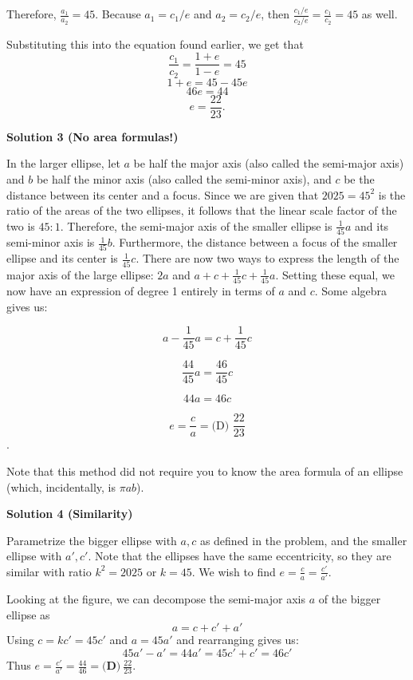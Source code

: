 \begin{enumerate}
 Therefore, $\frac{a_1}{a_2} = 45$. Because $a_1 = c_1/e$ and $a_2 = c_2/e$, then $\frac{c_1/e}{c_2/e} = \frac{c_1}{c_2}=45$ as well.

 Substituting this into the equation found earlier, we get that 
 \[\frac{c_1}{c_2} = \frac{1+e}{1-e} = 45\]
 \[1+e = 45-45e\]
 \[46e = 44\]
 \[e = \boxed{\frac{22}{23}}.\]




\textbf{Solution 3 (No area formulas!)}

In the larger ellipse, let $a$ be half the major axis (also called the semi-major axis) and $b$ be half the minor axis (also called the semi-minor axis), and $c$ be the distance between its center and a focus. Since we are given that $2025 = 45^2$ is the ratio of the areas of the two ellipses, it follows that the linear scale factor of the two is $45:1$. Therefore, the semi-major axis of the smaller ellipse is $\frac{1}{45}a$ and its semi-minor axis is $\frac{1}{45}b$. Furthermore, the distance between a focus of the smaller ellipse and its center is $\frac{1}{45}c$. There are now two ways to express the length of the major axis of the large ellipse: $2a$ and $a + c + \frac{1}{45}c + \frac{1}{45}a$. Setting these equal, we now have an expression of degree 1 entirely in terms of $a$ and $c$. Some algebra gives us:

 

 \[a-\frac{1}{45}a=c+\frac{1}{45}c\]

 \[\frac{44}{45}a=\frac{46}{45}c\]

 \[44a=46c\]

 \[e=\frac{c}{a}=\boxed{\text{(D) }\dfrac{22}{23}}\].

 
Note that this method did not require you to know the area formula of an ellipse (which, incidentally, is $\pi a b$).

 



\textbf{Solution 4 (Similarity)}

Parametrize the bigger ellipse with $a,c$ as defined in the problem, and the smaller ellipse with $a',c'$. Note that the ellipses have the same eccentricity, so they are similar with ratio $k^2=2025$ or $k=45$. We wish to find $e=\frac{c}{a}=\frac{c'}{a'}$.

 Looking at the figure, we can decompose the semi-major axis $a$ of the bigger ellipse as
 \[a=c+c'+a'\]Using $c=kc'=45c'$ and $a=45a'$ and rearranging gives us:
 \[45a'-a'=44a'=45c'+c'=46c'\]Thus $e=\frac{c'}{a'}=\frac{44}{46}=\boxed{\textbf{(D)}~\frac{22}{23}}.$




\end{enumerate}
